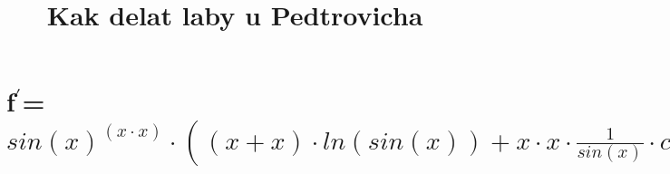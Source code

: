 \documentclass{article}
\title{Kak delat laby u Pedtrovicha}
\begin{document}
\maketitle
\section*{f$^{'}$=$ sin(x) ^ {(x \cdot x)} \cdot ((x + x) \cdot ln(sin(x)) + x \cdot x \cdot \frac{1}{sin(x)} \cdot cos(x)) $}
\end{document}
